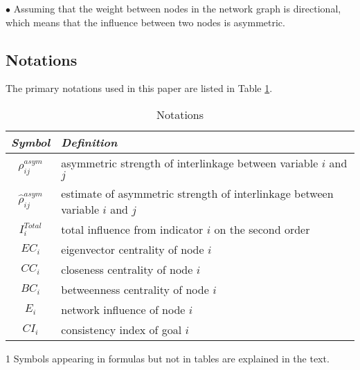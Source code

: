 \documentclass[12pt]{article}  %
\begin{document}
$\bullet$ Assuming that the weight between nodes in the network graph is directional, which means that the influence between two nodes is asymmetric.


 

 

\subsection{Notations}
The primary notations used in this paper are listed in Table \ref{tb:notation}.

\begin{table}[!htbp]
\vspace{-1.0em}\begin{center}\begin{threeparttable}
  
\renewcommand\arraystretch{1.2}

\caption{Notations}
\begin{tabular}{cl}
	\toprule
	\multicolumn{1}{m{3cm}}{\centering \textbf{\itshape{Symbol}}}
	&\multicolumn{1}{m{11cm}}{\centering \textbf{\itshape{Definition}}}\\
	\midrule
	$\rho_{ij}^{asym}$&asymmetric strength of interlinkage between variable $i$ and $j$\\
	$\hat{\rho}_{ij}^{asym}$&estimate of asymmetric strength of interlinkage between variable $i$ and $j$\\
 $I_i^{Total}$&total influence from indicator $i$ on the second order\\
	$EC_i$ &eigenvector centrality of node $i$\\
 $CC_i$&closeness centrality of node $i$\\
  $BC_i$&betweenness centrality of node $i$\\
  $E_i$&network influence of node $i$\\
  $CI_i$&consistency index of goal $i$\\
	\bottomrule
\end{tabular}\label{tb:notation}
\end{threeparttable}
\begin{tablenotes}
    \footnotesize
    \item[1] 
Symbols appearing in formulas but not in tables are explained in the text.
\end{tablenotes}
\end{center}\vspace{-1.0em}
\end{table}
\end{document}
